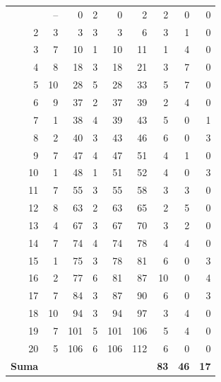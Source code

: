 \begin{longtable}{@{}rrrrrrrrr@{}}
\bottomrule \endlastfoot
1 & -- & 0 & 2 & 0 & 2 & 2 & 0 & 0 \\
2 & 3 & 3 & 3 & 3 & 6 & 3 & 1 & 0 \\
3 & 7 & 10 & 1 & 10 & 11 & 1 & 4 & 0 \\
4 & 8 & 18 & 3 & 18 & 21 & 3 & 7 & 0 \\
5 & 10 & 28 & 5 & 28 & 33 & 5 & 7 & 0 \\
6 & 9 & 37 & 2 & 37 & 39 & 2 & 4 & 0 \\
7 & 1 & 38 & 4 & 39 & 43 & 5 & 0 & 1 \\
8 & 2 & 40 & 3 & 43 & 46 & 6 & 0 & 3 \\
9 & 7 & 47 & 4 & 47 & 51 & 4 & 1 & 0 \\
10 & 1 & 48 & 1 & 51 & 52 & 4 & 0 & 3 \\
11 & 7 & 55 & 3 & 55 & 58 & 3 & 3 & 0 \\
12 & 8 & 63 & 2 & 63 & 65 & 2 & 5 & 0 \\
13 & 4 & 67 & 3 & 67 & 70 & 3 & 2 & 0 \\
14 & 7 & 74 & 4 & 74 & 78 & 4 & 4 & 0 \\
15 & 1 & 75 & 3 & 78 & 81 & 6 & 0 & 3 \\
16 & 2 & 77 & 6 & 81 & 87 & 10 & 0 & 4 \\
17 & 7 & 84 & 3 & 87 & 90 & 6 & 0 & 3 \\
18 & 10 & 94 & 3 & 94 & 97 & 3 & 4 & 0 \\
19 & 7 & 101 & 5 & 101 & 106 & 5 & 4 & 0 \\
20 & 5 & 106 & 6 & 106 & 112 & 6 & 0 & 0 \\
\midrule
\textbf{Suma} & & & & & & \textbf{83} & \textbf{46} & \textbf{17} \\
\end{longtable}
\endgroup